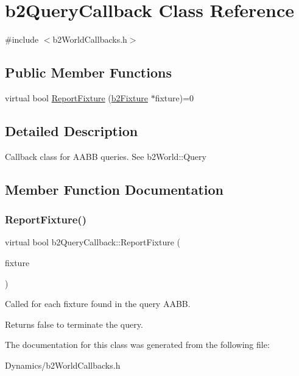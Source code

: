 \hypertarget{classb2QueryCallback}{}\section{b2\+Query\+Callback Class Reference}
\label{classb2QueryCallback}


{\ttfamily \#include $<$b2\+World\+Callbacks.\+h$>$}

\subsection*{Public Member Functions}
\begin{DoxyCompactItemize}
\item 
virtual bool \mbox{\hyperlink{classb2QueryCallback_a187dd04dd0f5164fb05c2ce2cbfd9ee5}{Report\+Fixture}} (\mbox{\hyperlink{classb2Fixture}{b2\+Fixture}} $\ast$fixture)=0
\end{DoxyCompactItemize}


\subsection{Detailed Description}
Callback class for A\+A\+BB queries. See b2\+World\+::\+Query 

\subsection{Member Function Documentation}
\mbox{\label{classb2QueryCallback_a187dd04dd0f5164fb05c2ce2cbfd9ee5}} 
\subsubsection{\texorpdfstring{Report\+Fixture()}{ReportFixture()}}
{\footnotesize\ttfamily virtual bool b2\+Query\+Callback\+::\+Report\+Fixture (\begin{DoxyParamCaption}\item[{\mbox{\hyperlink{classb2Fixture}{b2\+Fixture}} $\ast$}]{fixture }\end{DoxyParamCaption})\hspace{0.3cm}{\ttfamily [pure virtual]}}

Called for each fixture found in the query A\+A\+BB. \begin{DoxyReturn}{Returns}
false to terminate the query. 
\end{DoxyReturn}


The documentation for this class was generated from the following file\+:\begin{DoxyCompactItemize}
\item 
Dynamics/b2\+World\+Callbacks.\+h\end{DoxyCompactItemize}
